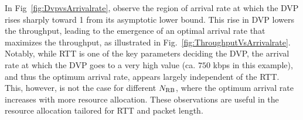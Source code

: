 In Fig~\ref{fig:DvpvsArrivalrate}, observe the region of arrival rate at which the DVP rises sharply toward 1 from its asymptotic lower bound.
This rise in DVP lowers the throughput, leading to the emergence of an optimal arrival rate that maximizes the throughput, as illustrated in Fig.~\ref{fig:ThroughputVsArrivalrate}.
Notably, while RTT is one of the key parameters deciding the DVP, the arrival rate at which the DVP goes to a very high value (ca. $750$ kbps in this example), and thus the optimum arrival rate, appears largely independent of the RTT. This, however, is not the case for different $N_{\mathrm{RB}}$, where the optimum arrival rate increases with more resource allocation. 
These observations are useful in the resource allocation tailored for RTT and packet length.







